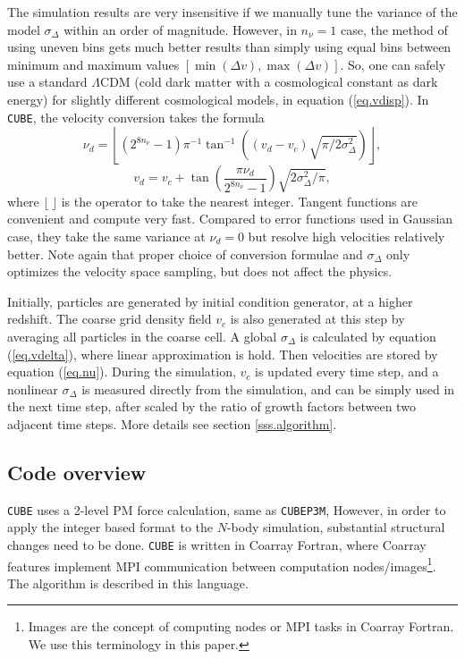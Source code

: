 \documentclass[10pt,twocolumn,preprint]{emulateapj}
\begin{document}
The simulation results are very insensitive if we manually tune the variance of the model $\sigma_\Delta$ within an order of magnitude. However, in $n_\nu=1$ case, the method of using uneven bins gets much better results than simply using equal bins between minimum and maximum values $[\min(\Delta v),\max(\Delta v)]$. So, one can safely use a standard $\Lambda$CDM (cold dark matter with a cosmological constant as dark energy) for slightly different cosmological models, in equation (\ref{eq.vdisp}). In {\tt CUBE}, the velocity conversion takes the formula
\begin{equation}\label{eq.nu}
	\nu_d=\left\lfloor(2^{8n_\nu}-1)\pi^{-1}\tan^{-1}\left((v_d-v_c)\sqrt{\pi/2\sigma_\Delta^2}\right)\right\rfloor,
\end{equation}
\begin{equation}\label{eq.v}
	v_d=v_c+\tan\left(\frac{\pi\nu_d}{2^{8n_\nu}-1}\right)\sqrt{2\sigma_\Delta^2/\pi},
\end{equation}
where $\lfloor\ \rfloor$ is the operator to take the nearest integer. 
Tangent functions are convenient and compute very fast. Compared to error 
functions used in Gaussian case, they take the same variance at $\nu_d=0$ but 
resolve high velocities relatively better.
Note again that proper choice of conversion formulae and $\sigma_\Delta$ 
only optimizes the velocity space sampling, but does not affect the physics. 

Initially, particles are generated by initial condition generator, at a higher redshift. The coarse grid density field $v_c$ is also generated at this step by averaging all particles in the coarse cell. A global $\sigma_\Delta$ is calculated by equation (\ref{eq.vdelta}), where linear approximation is hold. Then velocities are stored by equation (\ref{eq.nu}). During the simulation, $v_c$ is updated every time step, and a nonlinear $\sigma_\Delta$ is measured directly from the simulation, and can be simply used in the next time step, after scaled by the ratio of growth factors between two adjacent time steps. More details see section \ref{sss.algorithm}.

\subsection{Code overview}\label{ss.overview}
{\tt CUBE} uses a 2-level PM force calculation, same as {\tt CUBEP3M}, However, in order to apply the integer based format to the $N$-body simulation, substantial structural changes need to be done. {\tt CUBE} is written in Coarray Fortran, where Coarray features implement MPI communication between computation nodes/images\footnote{Images are the concept of computing nodes or MPI tasks in Coarray Fortran. We use this terminology in this paper.}.
The algorithm is described in this language. 
\end{document}

